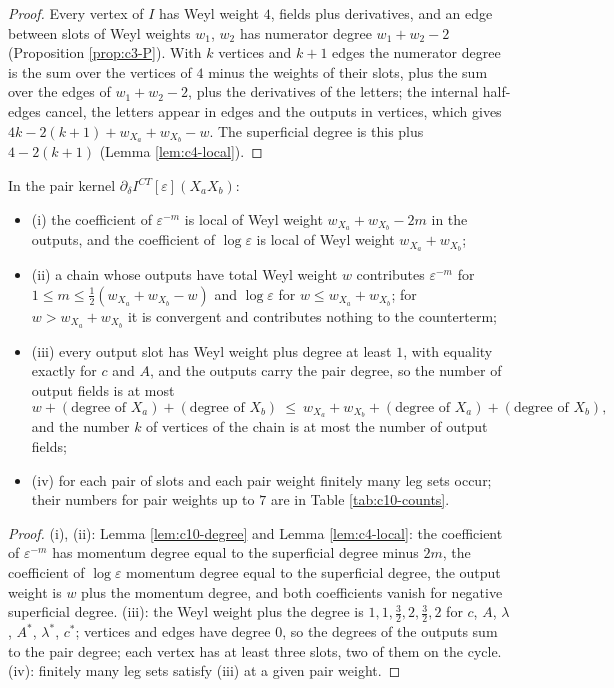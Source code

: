 \begin{proof}
Every vertex of $I$ has Weyl weight $4$, fields plus derivatives, and an edge between slots of Weyl weights $w_1$, $w_2$ has numerator degree $w_1+w_2-2$ (Proposition \ref{prop:c3-P}). With $k$ vertices and $k+1$ edges the numerator degree is the sum over the vertices of $4$ minus the weights of their slots, plus the sum over the edges of $w_1+w_2-2$, plus the derivatives of the letters; the internal half-edges cancel, the letters appear in edges and the outputs in vertices, which gives $4k-2(k+1)+w_{X_a}+w_{X_b}-w$. The superficial degree is this plus $4-2(k+1)$ (Lemma \ref{lem:c4-local}).
\end{proof}

\begin{proposition}
\label{prop:c10-bound}
In the pair kernel $\partial_\delta I^{CT}[\varepsilon](X_aX_b)$:
\begin{itemize}
\item (i) the coefficient of $\varepsilon^{-m}$ is local of Weyl weight $w_{X_a}+w_{X_b}-2m$ in the outputs, and the coefficient of $\log\varepsilon$ is local of Weyl weight $w_{X_a}+w_{X_b}$;
\item (ii) a chain whose outputs have total Weyl weight $w$ contributes $\varepsilon^{-m}$ for $1\le m\le\tfrac12(w_{X_a}+w_{X_b}-w)$ and $\log\varepsilon$ for $w\le w_{X_a}+w_{X_b}$; for $w>w_{X_a}+w_{X_b}$ it is convergent and contributes nothing to the counterterm;
\item (iii) every output slot has Weyl weight plus degree at least $1$, with equality exactly for $c$ and $A$, and the outputs carry the pair degree, so the number of output fields is at most
\[
w+(\text{degree of }X_a)+(\text{degree of }X_b)\ \le\ w_{X_a}+w_{X_b}+(\text{degree of }X_a)+(\text{degree of }X_b),
\]
and the number $k$ of vertices of the chain is at most the number of output fields;
\item (iv) for each pair of slots and each pair weight finitely many leg sets occur; their numbers for pair weights up to $7$ are in Table \ref{tab:c10-counts}.
\end{itemize}
\end{proposition}

\begin{proof}
(i), (ii): Lemma \ref{lem:c10-degree} and Lemma \ref{lem:c4-local}: the coefficient of $\varepsilon^{-m}$ has momentum degree equal to the superficial degree minus $2m$, the coefficient of $\log\varepsilon$ momentum degree equal to the superficial degree, the output weight is $w$ plus the momentum degree, and both coefficients vanish for negative superficial degree. (iii): the Weyl weight plus the degree is $1,1,\tfrac32,2,\tfrac32,2$ for $c$, $A$, $\lambda$, $A^*$, $\lambda^*$, $c^*$; vertices and edges have degree $0$, so the degrees of the outputs sum to the pair degree; each vertex has at least three slots, two of them on the cycle. (iv): finitely many leg sets satisfy (iii) at a given pair weight.
\end{proof}

